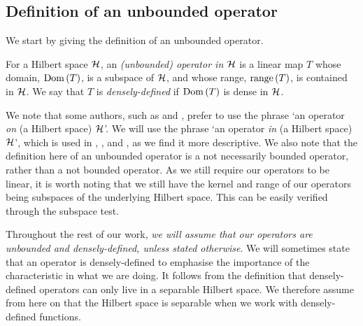 \subsection{Definition of an unbounded operator}

We start by giving the definition of an unbounded operator.

\begin{definition}
  For a Hilbert space $\mathcal{H}$, an {\emph{(unbounded) operator in
  $\mathcal{H}$}} is a linear map $T$ whose domain, $\operatorname{Dom}\left(T\right)$, is a subspace of $\mathcal{H}$, and whose range, $\operatorname{range}\left(T\right)$, is contained in $\mathcal{H}$. We say that $T$ is {\emph{densely-defined}} if $\operatorname{Dom}\left(T\right)$ is dense in $\mathcal{H}$.
\end{definition}
We note that some authors, such as {\cite{Hall2013}} and {\cite{konrad}}, prefer to use the phrase `an operator {\emph{on}} (a Hilbert space) $\mathcal{H}$'. We will use the phrase `an operator {\emph{in}} (a Hilbert space) $\mathcal{H}$', which is used in {\cite{teschl}}, {\cite{analysis_now}}, and {\cite{kreyszig}}, as we find it more descriptive. We also note that the definition here of an unbounded operator is a not necessarily bounded operator, rather than a not bounded operator. As we still require our operators to be linear, it is worth noting that we still have the kernel and range of our operators being subspaces of the underlying Hilbert space. This can be easily verified through the subspace test.

\medskip

Throughout the rest of our work, {\emph{we will assume that our operators are unbounded and densely-defined, unless stated otherwise}}. We will sometimes state that an operator is densely-defined to emphasise the importance of the characteristic in what we are doing. It follows from the definition that densely-defined operators can only live in a separable Hilbert space. We therefore assume from here on that the Hilbert space is separable when we work with densely-defined functions.

\medskip


